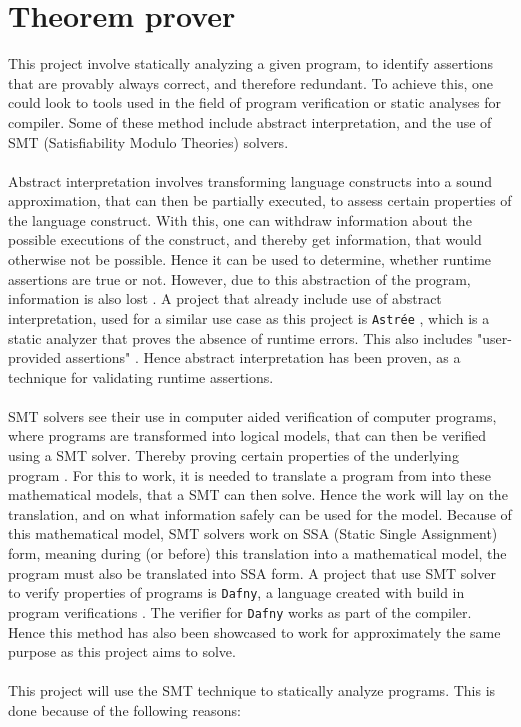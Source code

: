 
\section{Theorem prover } \label{sec:z3}
This project involve statically analyzing a given program, to identify assertions that are
provably always correct, and therefore redundant. To achieve this, one could look to tools used in
the field of program verification or static analyses for compiler.
Some of these method include abstract interpretation, and the use of SMT
(Satisfiability Modulo Theories) solvers.
\\
\\
Abstract interpretation involves transforming language constructs into a sound approximation,
that can then be partially executed, to assess certain properties of the language construct.
With this, one can withdraw information about the possible executions of the construct, and
thereby get information, that would otherwise not be possible. Hence it can be used to determine,
whether runtime assertions are true or not. However, due to this abstraction of the program,
information is also lost \cite{ai}. A project that already include use of abstract interpretation,
used for a similar use case as this project is \texttt{Astrée} \cite{astree}, which is a static
analyzer that proves the absence of runtime errors. This also includes "user-provided assertions"
\cite{astree}. Hence abstract interpretation has been proven, as a technique for validating
runtime assertions.
\\
\\
SMT solvers see their use in computer aided verification of computer programs, where programs
are transformed into logical models, that can then be verified using a SMT solver. Thereby proving
certain properties of the underlying program \cite{sigda}. For this to work, it is needed to
translate a program from \lan into these mathematical models, that a SMT can then solve. Hence
the work will lay on the translation, and on what information safely can be used for the model.
Because of this mathematical model, SMT solvers work on SSA (Static Single Assignment) form,
meaning during (or before) this translation into a mathematical model, the \lan program must also
be translated into SSA form. A project that use SMT solver to verify properties of programs is
\texttt{Dafny}, a language created with build in program verifications \cite{dafny}. The verifier
for \texttt{Dafny} works as part of the compiler. Hence this method has also been showcased to work
for approximately the same purpose as this project aims to solve.
\\
\\
This project will use the SMT technique to statically analyze \lan programs. This is done because
of the following reasons:

